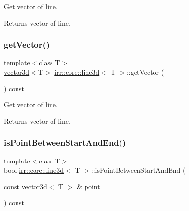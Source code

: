 Get vector of line. 

\begin{DoxyReturn}{Returns}
vector of line. 
\end{DoxyReturn}
\mbox{\label{classirr_1_1core_1_1line3d_a8df2350580b6be884b6f6d48c8932795}} 
\subsubsection{\texorpdfstring{get\+Vector()}{getVector()}\hspace{0.1cm}{\footnotesize\ttfamily [2/2]}}
{\footnotesize\ttfamily template$<$class T$>$ \\
\hyperlink{classirr_1_1core_1_1vector3d}{vector3d}$<$T$>$ \hyperlink{classirr_1_1core_1_1line3d}{irr\+::core\+::line3d}$<$ T $>$\+::get\+Vector (\begin{DoxyParamCaption}{ }\end{DoxyParamCaption}) const\hspace{0.3cm}{\ttfamily [inline]}}



Get vector of line. 

\begin{DoxyReturn}{Returns}
vector of line. 
\end{DoxyReturn}
\mbox{\label{classirr_1_1core_1_1line3d_abe1e874f2058e965bc52802c41672fbc}} 
\subsubsection{\texorpdfstring{is\+Point\+Between\+Start\+And\+End()}{isPointBetweenStartAndEnd()}\hspace{0.1cm}{\footnotesize\ttfamily [1/2]}}
{\footnotesize\ttfamily template$<$class T$>$ \\
bool \hyperlink{classirr_1_1core_1_1line3d}{irr\+::core\+::line3d}$<$ T $>$\+::is\+Point\+Between\+Start\+And\+End (\begin{DoxyParamCaption}\item[{const \hyperlink{classirr_1_1core_1_1vector3d}{vector3d}$<$ T $>$ \&}]{point }\end{DoxyParamCaption}) const\hspace{0.3cm}{\ttfamily [inline]}}



